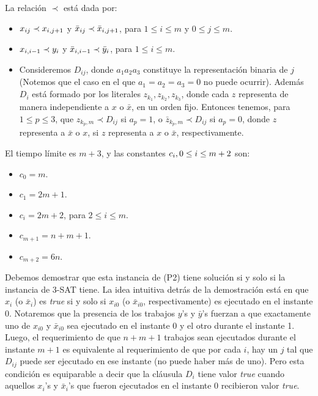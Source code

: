 \documentclass[14pt]{extarticle}
\begin{document}
La relación $\prec$ está dada por:

\begin{itemize}
    \item $x_{ij} \prec x_{i, j+1} \space$ y $\space \bar x_{ij} \prec \bar x_{i, j+1}$, para $1 \leq i \leq m$ y $0 \leq j \leq m$.
    \item $x_{i, i-1} \prec y_{i} \space$ y $\space \bar x_{i, i-1} \prec \bar y_{i}$, para $1 \leq i \leq m$.
    \item Consideremos $D_{ij}$, donde $a_1a_2a_3$ constituye la representación binaria de $j$ (Notemos que el caso en el que $a_1 = a_2 = a_3 = 0$ no puede ocurrir). Además $D_i$ está formado por los literales $z_{k_1}, z_{k_2}, z_{k_3}$, donde cada $z$ representa de manera independiente a $x$ o $\bar x$, en un orden fijo. Entonces tenemos, para $1 \leq p \leq 3$, que $z_{k_p, m} \prec D_{ij}$ si $a_p = 1$, o $\bar z_{k_p, m} \prec D_{ij}$ si $a_p = 0$, donde $z$ representa a $\bar x$ o $x$, si $z$ representa a $x$ o $\bar x$, respectivamente.
\end{itemize}

El tiempo límite es $m + 3$, y las constantes $c_i, \space 0 \leq i \leq m + 2$ son:

\begin{itemize}
    \item $c_0 = m$.
    \item $c_1 = 2m + 1$.
    \item $c_i = 2m + 2$, para $2 \leq i \leq m$.
    \item $c_{m+1} = n + m + 1$.
    \item $c_{m+2} = 6n$.
\end{itemize}

Debemos demostrar que esta instancia de (P2) tiene solución si y solo si la instancia de 3-SAT tiene. La idea intuitiva detrás de la demostración está en que $x_i$ (o $\bar x_i$) es \textit{true} si y solo si $x_{i0}$ (o $\bar x_{i0}$, respectivamente) es ejecutado en el instante 0. Notaremos que la presencia de los trabajos $y$'s y $\bar y$'s fuerzan a que exactamente uno de $x_{i0}$ y $\bar x_{i0}$ sea ejecutado en el instante 0 y el otro durante el instante 1. Luego, el requerimiento de que $n + m + 1$ trabajos sean ejecutados durante el instante $m + 1$ es equivalente al requerimiento de que por cada $i$, hay un $j$ tal que $D_{ij}$ puede ser ejecutado en ese instante (no puede haber más de uno). Pero esta condición es equiparable a decir que la cláusula $D_i$ tiene valor \textit{true} cuando aquellos $x_i$'s y $\bar x_i$'s que fueron ejecutados en el instante 0 recibieron valor \textit{true}.
\end{document}
